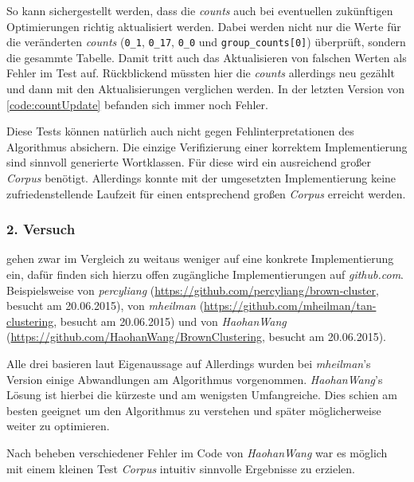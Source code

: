 		So kann sichergestellt werden, dass die \emph{counts} auch bei eventuellen zukünftigen Optimierungen richtig aktualisiert werden. Dabei werden nicht nur die Werte für die veränderten \emph{counts} (\texttt{0\_1}, \texttt{0\_17}, \texttt{0\_0} und \texttt{group\_counts[0]}) überprüft, sondern die gesammte Tabelle. Damit tritt auch das Aktualisieren von falschen Werten als Fehler im Test auf. Rückblickend müssten hier die \emph{counts} allerdings neu gezählt und dann mit den Aktualisierungen verglichen werden. In der letzten Version von \autoref{code:countUpdate} befanden sich immer noch Fehler.
		\newpage

		Diese Tests können natürlich auch nicht gegen Fehlinterpretationen des Algorithmus absichern. Die einzige Verifizierung einer korrektem Implementierung sind sinnvoll generierte Wortklassen. Für diese wird ein ausreichend großer \emph{Corpus} benötigt. Allerdings konnte mit der umgesetzten Implementierung keine zufriedenstellende Laufzeit für einen entsprechend großen \emph{Corpus} erreicht werden.

	\subsubsection*{2. Versuch}
        							
		\cite{cumpatationalLinguistics:classBasedNGramms} gehen zwar im Vergleich zu \cite{speechcommunication:exchange} weitaus weniger auf eine konkrete Implementierung ein, dafür finden sich hierzu offen zugängliche Implementierungen auf \emph{github.com}. Beispielsweise von \emph{percyliang} (\url{https://github.com/percyliang/brown-cluster}, besucht am 20.06.2015), von \emph{mheilman} (\url{https://github.com/mheilman/tan-clustering}, besucht am 20.06.2015) und von \emph{HaohanWang} (\url{https://github.com/HaohanWang/BrownClustering}, besucht am 20.06.2015).
            
		Alle drei basieren laut Eigenaussage auf \cite{cumpatationalLinguistics:classBasedNGramms} Allerdings wurden bei \emph{mheilman}'s Version einige Abwandlungen am Algorithmus vorgenommen. \emph{HaohanWang}'s Lösung ist hierbei die kürzeste und am wenigsten Umfangreiche. Dies schien am besten geeignet um den Algorithmus zu verstehen und später möglicherweise weiter zu optimieren. 
            
		Nach beheben verschiedener Fehler im Code von \emph{HaohanWang} war es möglich mit einem kleinen Test \emph{Corpus} intuitiv sinnvolle Ergebnisse zu erzielen.
        \newline
            

